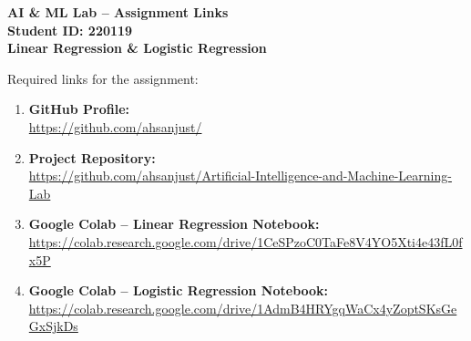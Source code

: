 \documentclass{article}
\begin{document}
\begin{center}
    {\huge \textbf{AI \& ML Lab -- Assignment Links}} \\[0.3cm]
    {\large \textbf{Student ID: 220119}} \\[0.1cm]
    {\large \textbf{Linear Regression \& Logistic Regression}} \\[0.5cm]
\end{center}

\noindent Required links for the assignment:

\begin{enumerate}[leftmargin=*, itemsep=0.3cm]

    \item \textbf{GitHub Profile:} \\
    \url{https://github.com/ahsanjust/}

    \item \textbf{Project Repository:} \\
    \url{https://github.com/ahsanjust/Artificial-Intelligence-and-Machine-Learning-Lab}

    \item \textbf{Google Colab -- Linear Regression Notebook:} \\
    \url{https://colab.research.google.com/drive/1CeSPzoC0TaFe8V4YO5Xti4e43fL0fx5P}

    \item \textbf{Google Colab -- Logistic Regression Notebook:} \\
    \url{https://colab.research.google.com/drive/1AdmB4HRYgqWaCx4yZoptSKsGeGxSjkDs}

\end{enumerate}

\vfill

\end{document}
